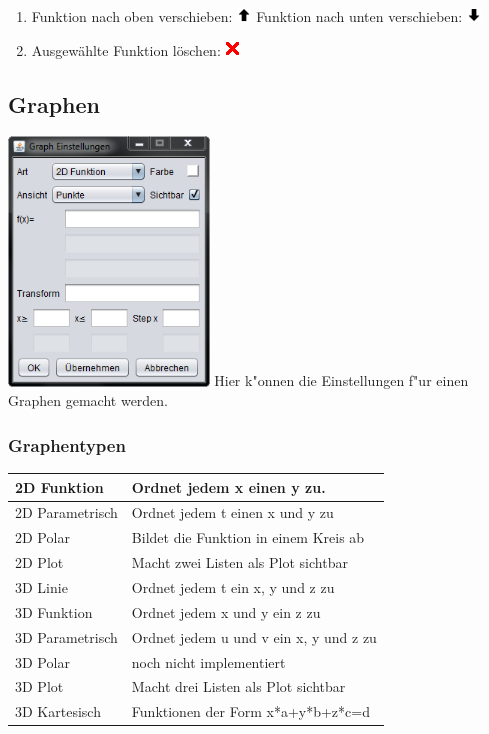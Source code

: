 \documentclass{scrartcl}
\begin{document}
\begin{enumerate}
 \item Funktion nach oben verschieben: \includegraphics[width=0.03\textwidth]{images/gIcons/arrow_up.png} Funktion nach unten verschieben: \includegraphics[width=0.03\textwidth]{images/gIcons/arrow_down.png}
 \item Ausgew\"ahlte Funktion l\"oschen: \includegraphics[width=0.03\textwidth]{images/gIcons/delete.png}
\end{enumerate}
\subsection{Graphen}
\includegraphics[width=0.4\textwidth]{images/program/graph-window.png}\newline
Hier k"onnen die Einstellungen f"ur einen Graphen gemacht werden.
\subsubsection{Graphentypen}
\begin{tabular}[b]{|l|l|}
\hline
2D Funktion & Ordnet jedem x einen y zu. \\
\hline
2D Parametrisch & Ordnet jedem t einen x und y zu \\
\hline
2D Polar & Bildet die Funktion in einem Kreis ab \\
\hline
2D Plot & Macht zwei Listen als Plot sichtbar \\
\hline
3D Linie & Ordnet jedem t ein x, y und z zu \\
\hline
3D Funktion & Ordnet jedem x und y ein z zu \\
\hline
3D Parametrisch & Ordnet jedem u und v ein x, y und z zu \\
\hline
3D Polar & noch nicht implementiert \\
\hline
3D Plot & Macht drei Listen als Plot sichtbar \\
\hline
3D Kartesisch & Funktionen der Form x*a+y*b+z*c=d \\
\hline
\end{tabular}
\end{document}
